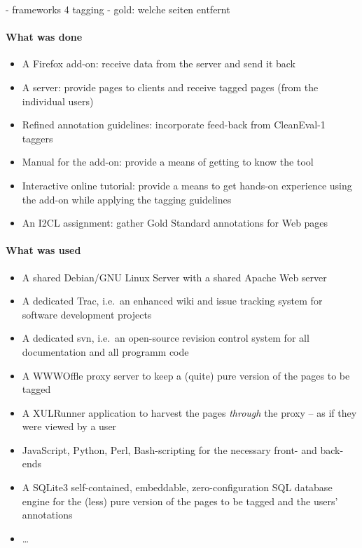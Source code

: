 \begin{longversion}
%
%
- frameworks 4 tagging
- gold: welche seiten entfernt

\paragraph{What was done}
\begin{itemize}
\item A Firefox add-on: receive data from the server and send it back  
\item A server: provide pages to clients and receive tagged pages (from the individual users)
\item Refined annotation guidelines: incorporate feed-back from CleanEval-1 taggers
\item Manual for the add-on: provide a means of getting to know the tool
\item Interactive online tutorial: provide a means to get hands-on experience using the add-on while applying the tagging guidelines
\item An I2CL assignment: gather Gold Standard annotations for Web pages  
\end{itemize}

\paragraph{What was used}
\begin{itemize}
\item A shared Debian/GNU Linux Server with a shared Apache Web server
\item A dedicated Trac, i.e.~an enhanced wiki and issue tracking system for software development projects
\item A dedicated svn, i.e.~an open-source revision control system for all documentation and all programm code
\item A WWWOffle proxy server to keep a (quite) pure version of the pages to be tagged
\item A XULRunner application to harvest the pages \textit{through} the proxy -- as if they were viewed by a user
\item JavaScript, Python, Perl, Bash-scripting for the necessary front- and back-ends
\item A SQLite3 self-contained, embeddable, zero-configuration SQL database engine for the (less) pure version of the pages to be tagged and the users' annotations
\item \ldots
\end{itemize}




\end{longversion}
